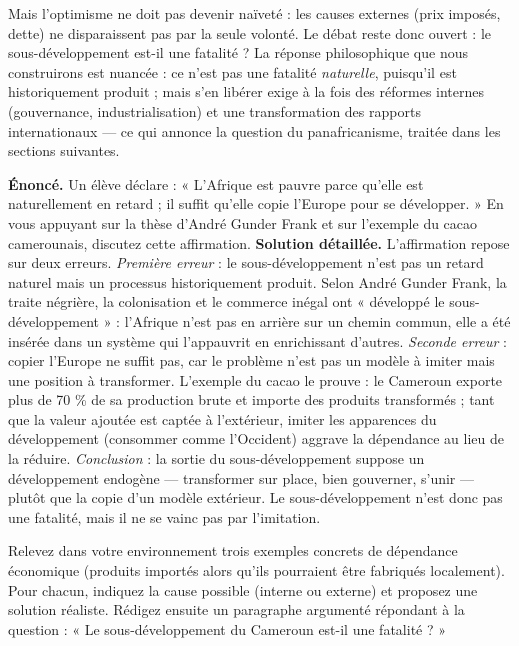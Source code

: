 \documentclass[11pt]{article}
\begin{document}
Mais l'optimisme ne doit pas devenir naïveté : les causes externes (prix imposés, dette) ne disparaissent pas par la seule volonté. Le débat reste donc ouvert : le sous-développement est-il une fatalité ? La réponse philosophique que nous construirons est nuancée : ce n'est pas une fatalité \emph{naturelle}, puisqu'il est historiquement produit ; mais s'en libérer exige à la fois des réformes internes (gouvernance, industrialisation) et une transformation des rapports internationaux — ce qui annonce la question du panafricanisme, traitée dans les sections suivantes.

\begin{exoresolu}
\textbf{Énoncé.} Un élève déclare : « L'Afrique est pauvre parce qu'elle est naturellement en retard ; il suffit qu'elle copie l'Europe pour se développer. » En vous appuyant sur la thèse d'André Gunder Frank et sur l'exemple du cacao camerounais, discutez cette affirmation.
\tcblower
\textbf{Solution détaillée.} L'affirmation repose sur deux erreurs. \emph{Première erreur} : le sous-développement n'est pas un retard naturel mais un processus historiquement produit. Selon André Gunder Frank, la traite négrière, la colonisation et le commerce inégal ont « développé le sous-développement » : l'Afrique n'est pas en arrière sur un chemin commun, elle a été insérée dans un système qui l'appauvrit en enrichissant d'autres. \emph{Seconde erreur} : copier l'Europe ne suffit pas, car le problème n'est pas un modèle à imiter mais une position à transformer. L'exemple du cacao le prouve : le Cameroun exporte plus de 70 \% de sa production brute et importe des produits transformés ; tant que la valeur ajoutée est captée à l'extérieur, imiter les apparences du développement (consommer comme l'Occident) aggrave la dépendance au lieu de la réduire. \emph{Conclusion} : la sortie du sous-développement suppose un développement endogène — transformer sur place, bien gouverner, s'unir — plutôt que la copie d'un modèle extérieur. Le sous-développement n'est donc pas une fatalité, mais il ne se vainc pas par l'imitation.
\end{exoresolu}

\begin{exercice}
Relevez dans votre environnement trois exemples concrets de dépendance économique (produits importés alors qu'ils pourraient être fabriqués localement). Pour chacun, indiquez la cause possible (interne ou externe) et proposez une solution réaliste. Rédigez ensuite un paragraphe argumenté répondant à la question : « Le sous-développement du Cameroun est-il une fatalité ? »
\end{exercice}
\end{document}
